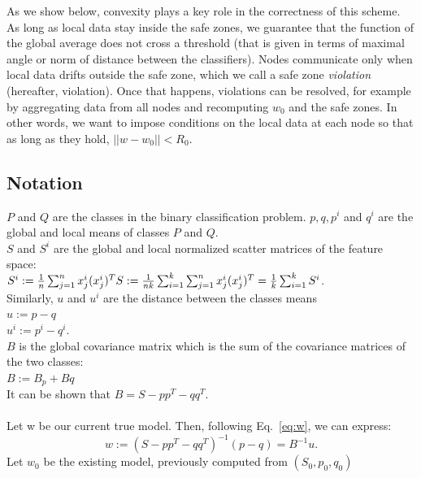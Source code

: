 \documentclass{sig-alternate-05-2015}
\begin{document}
\par As we show below, convexity
plays a key role in the correctness of this scheme. As long
as local data stay inside the safe zones, we guarantee that
the function of the global average does not cross a threshold (that is given
in terms of maximal angle or norm of distance between the classifiers).
Nodes communicate only when local data drifts outside the
safe zone, which we call a safe zone \textit{violation} (hereafter,
violation). Once that happens, violations can be resolved, for example by aggregating
data from all nodes and recomputing $w_0$ and the safe zones.
In other words, we want to impose conditions on the local
data at each node so that as long as they hold, $||w-w_0||<R_0$.

\subsection{Notation}
\noindent
$P$ and $Q$ are the classes in the binary classification problem.
 $p,q,p^i$ and $q^i$  are the global and local means of classes $P$ and $Q$.
\\$S$ and $S^i$  are the global and local normalized scatter matrices of the feature space:
\\$S^i := \frac{1}{n}\sum_{j=1}^{n}x^i_j(x^i_j)^T
\\S := \frac{1}{nk}
\sum_{i=1}^k\sum_{j=1}^nx^i_j(x^i_j)^T=\frac{1}{k}\sum_{i=1}^kS^i$.
\\Similarly, $u$ and $u^i$ are the distance between the classes means
\\$u:=p - q$
\\$u^i:=p^i - q^i$.
\\ $B$ is the global covariance matrix which is the sum of the covariance
matrices of the two classes:
\\$B:=B_p+Bq$
\\It can be shown that
$B=S - pp^T - qq^T$.
\\\\Let w be our current true model. Then, following Eq.~\ref{eq:w}, we can
express:
\begin{equation*}
w:=(S - pp^T - qq^T)^{-1}(p-q)=B^{-1}u.
\end{equation*}
Let $w_0$ be the existing model, previously computed from $(S_0, p_0, q_0)$
\end{document}
